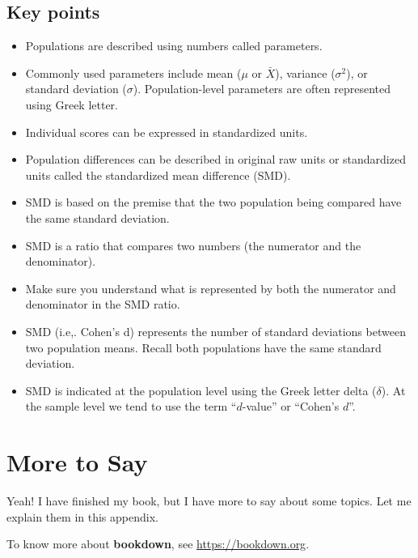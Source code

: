 \documentclass[
]{krantz}
\begin{document}
\hypertarget{key-points}{%
\section{Key points}\label{key-points}}

\begin{itemize}
\item
  Populations are described using numbers called parameters.
\item
  Commonly used parameters include mean (\(\mu\) or \(\bar{X}\)), variance (\(\sigma^2\)), or standard deviation (\(\sigma\)). Population-level parameters are often represented using Greek letter.
\item
  Individual scores can be expressed in standardized units.
\item
  Population differences can be described in original raw units or standardized units called the standardized mean difference (SMD).
\item
  SMD is based on the premise that the two population being compared have the same standard deviation.
\item
  SMD is a ratio that compares two numbers (the numerator and the denominator).
\item
  Make sure you understand what is represented by both the numerator and denominator in the SMD ratio.
\item
  SMD (i.e,. Cohen's d) represents the number of standard deviations between two population means. Recall both populations have the same standard deviation.
\item
  SMD is indicated at the population level using the Greek letter delta (\(\delta\)). At the sample level we tend to use the term ``\(d\)-value'' or ``Cohen's \(d\)''.
\end{itemize}

\cleardoublepage

\hypertarget{appendix-appendix}{%
\appendix {}}


\hypertarget{more-to-say}{%
\chapter{More to Say}\label{more-to-say}}

Yeah! I have finished my book, but I have more to say about some topics. Let me explain them in this appendix.

To know more about \textbf{bookdown}, see \url{https://bookdown.org}.

  

\backmatter
\printindex
\end{document}
